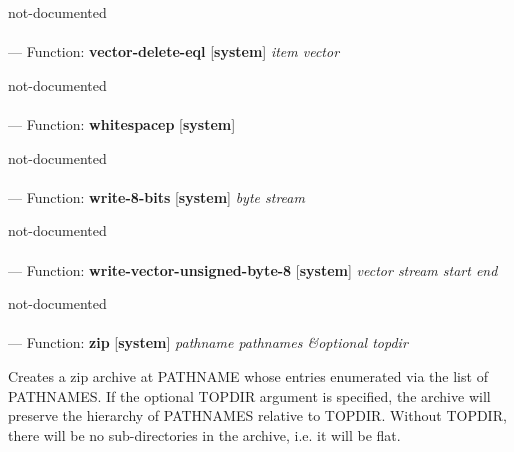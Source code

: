 \begin{adjustwidth}{5em}{5em}
not-documented
\end{adjustwidth}

\paragraph{}
\label{SYSTEM:VECTOR-DELETE-EQL}
--- Function: \textbf{vector-delete-eql} [\textbf{system}] \textit{item vector}

\begin{adjustwidth}{5em}{5em}
not-documented
\end{adjustwidth}

\paragraph{}
\label{SYSTEM:WHITESPACEP}
--- Function: \textbf{whitespacep} [\textbf{system}] \textit{}

\begin{adjustwidth}{5em}{5em}
not-documented
\end{adjustwidth}

\paragraph{}
\label{SYSTEM:WRITE-8-BITS}
--- Function: \textbf{write-8-bits} [\textbf{system}] \textit{byte stream}

\begin{adjustwidth}{5em}{5em}
not-documented
\end{adjustwidth}

\paragraph{}
\label{SYSTEM:WRITE-VECTOR-UNSIGNED-BYTE-8}
--- Function: \textbf{write-vector-unsigned-byte-8} [\textbf{system}] \textit{vector stream start end}

\begin{adjustwidth}{5em}{5em}
not-documented
\end{adjustwidth}

\paragraph{}
\label{SYSTEM:ZIP}
--- Function: \textbf{zip} [\textbf{system}] \textit{pathname pathnames \&optional topdir}

\begin{adjustwidth}{5em}{5em}
Creates a zip archive at PATHNAME whose entries enumerated via the list of PATHNAMES.
If the optional TOPDIR argument is specified, the archive will preserve the hierarchy of PATHNAMES relative to TOPDIR.  Without TOPDIR, there will be no sub-directories in the archive, i.e. it will be flat.
\end{adjustwidth}

